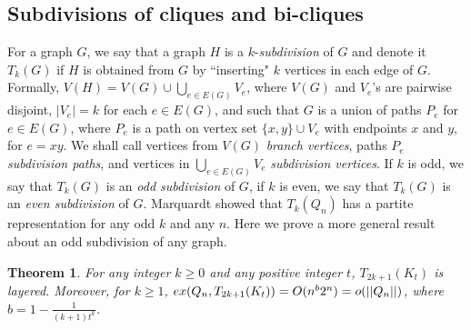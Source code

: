 \documentclass[11pt, a4paper]{article}
\newtheorem{theorem}{Theorem}
\newcommand{\ex}{{\rm  ex}}
\begin{document}
				
\subsection{Subdivisions of cliques and bi-cliques}	


For a graph $G$, we say that a graph $H$ is a $k$-{\it subdivision} of $G$ and denote it  $T_k(G)$ if $H$ is obtained from $G$ by ``inserting" $k$ vertices in each edge of $G$. Formally, 
$V(H)= V(G)\cup \bigcup_{e\in E(G)} V_e$, where $V(G)$ and $V_e$'s are pairwise disjoint, $|V_e|=k$ for each $e\in E(G)$,  and such that $G$ is a union of paths $P_e$ for $e\in E(G)$, where $P_e$ is a path on vertex set $\{x, y\}\cup V_e$ with endpoints $x$ and $y$, for $e=xy$. We shall call vertices from $V(G)$ {\it branch vertices},
paths $P_e$ {\it subdivision paths}, and vertices in $\bigcup_{e\in E(G)} V_e$ {\it subdivision vertices}. If $k$ is odd, we say that $T_k(G)$ is an {\it odd subdivision} of $G$, if 
$k$ is even, we say that $T_k(G)$ is an {\it even subdivision} of $G$.
Marquardt \cite{M} showed that $T_k(Q_n)$ has a partite representation for any odd $k$ and any $n$. Here we prove a more general result about an odd subdivision of any graph.
		


	
\begin{theorem}\label{complete}
For any integer $k\geq 0$ and any positive integer $t$, $T_{2k+1}(K_t)$ is  layered. Moreover,  for $k\geq 1$, 
$\ex(Q_n, T_{2k+1}(K_t)) = O(n^b2^n)= o(||Q_n||)$, where $b=1-\frac{1}{(k+1)t^k}$.
\end{theorem}		
\end{document}
